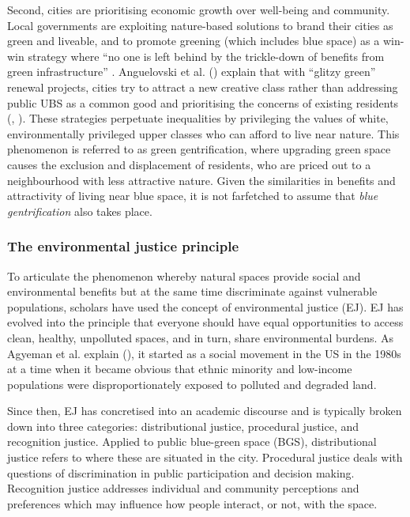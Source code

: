 \documentclass{article}
\begin{document}
Second, cities are prioritising economic growth over well-being and community. Local governments are exploiting nature-based solutions to brand their cities as green and liveable,
and to promote greening (which includes blue space) as a win-win strategy where ``no one is left behind by the trickle-down of benefits from green infrastructure'' \parencite{anguelovski2021green}.
Anguelovski et al. (\citeyear{anguelovski2021green}) explain that with ``glitzy green'' renewal projects, cities try to attract a new creative class rather than addressing public UBS as a common good and prioritising the concerns of existing residents (\cite{wessells2014urban}, \cite{anguelovski2020expanding}).
These strategies perpetuate inequalities by privileging the values of white, environmentally privileged upper classes who can afford to live near nature. This phenomenon is referred to as green gentrification, where upgrading green space causes the exclusion and displacement of residents, who are priced out to a neighbourhood with less attractive nature. Given the similarities in benefits and attractivity of living near blue space, it is not farfetched to assume that \textit{blue gentrification} also takes place.


\subsubsection{The environmental justice principle}

To articulate the phenomenon whereby natural spaces provide social and environmental benefits but at the same time discriminate against vulnerable populations, scholars have used the concept of environmental justice (EJ).
EJ has evolved into the principle that everyone should have equal opportunities to access clean, healthy, unpolluted spaces, and in turn, share environmental burdens. As Agyeman et al. explain (\citeyear{agyeman2016trends}), it started as a social movement in the US in the 1980s at a time when it became obvious that ethnic minority and low-income populations were disproportionately exposed to polluted and degraded land.

Since then, EJ has concretised into an academic discourse and is typically broken down into three categories: distributional justice, procedural justice, and recognition justice.
Applied to public blue-green space (BGS), distributional justice refers to where these are situated in the city.
Procedural justice deals with questions of discrimination in public participation and decision making. 
Recognition justice addresses individual and community perceptions and preferences which may influence how people interact, or not, with the space.
\end{document}
